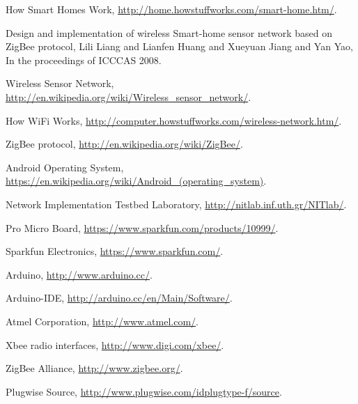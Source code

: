 \documentclass[conference]{IEEEtran}
\begin{document}
\begin{thebibliography}{9}

 How Smart Homes Work, \url{http://home.howstuffworks.com/smart-home.htm/}.

 Design and implementation of wireless Smart-home sensor network based on ZigBee protocol, Lili Liang and Lianfen Huang and Xueyuan Jiang and Yan Yao, In the proceedings of ICCCAS 2008.

Wireless Sensor Network, \url{http://en.wikipedia.org/wiki/Wireless_sensor_network/}.

How WiFi Works, \url{http://computer.howstuffworks.com/wireless-network.htm/}.

ZigBee protocol, \url{http://en.wikipedia.org/wiki/ZigBee/}.

Android Operating System, \url{https://en.wikipedia.org/wiki/Android_(operating_system)}.

Network Implementation Testbed Laboratory, \url{http://nitlab.inf.uth.gr/NITlab/}.

Pro Micro Board, \url{https://www.sparkfun.com/products/10999/}.

Sparkfun Electronics, \url{https://www.sparkfun.com/}.

Arduino, \url{http://www.arduino.cc/}.

Arduino-IDE, \url{http://arduino.cc/en/Main/Software/}.

Atmel Corporation, \url{http://www.atmel.com/}.

Xbee radio interfaces, \url{http://www.digi.com/xbee/}.

ZigBee Alliance, \url{http://www.zigbee.org/}.

Plugwise Source, \url{http://www.plugwise.com/idplugtype-f/source}.

\end{thebibliography}






\end{document}
